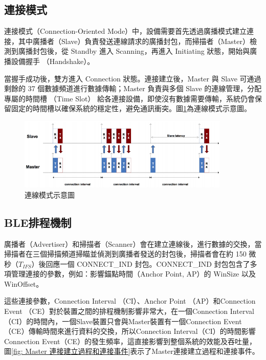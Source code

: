 \begin{ZhChapter}
\subsection{連接模式}

連接模式（Connection-Oriented Mode）中，設備需要首先透過廣播模式建立連接，其中廣播者（Slave）負責發送連線請求的廣播封包，而掃描者（Master）檢測到廣播封包後，從 Standby 進入 Scanning，再進入 Initiating 狀態，開始與廣播設備握手 （Handshake）。

當握手成功後，雙方進入 Connection 狀態。連接建立後，Master 與 Slave 可通過剩餘的 37 個數據頻道進行數據傳輸；Master 負責與多個 Slave 的連線管理，分配專屬的時間槽 （Time Slot） 給各連接設備，即使沒有數據需要傳輸，系統仍會保留固定的時間槽以確保系統的穩定性，避免通訊衝突。圖\ref{fig: 連線模式示意圖}為連線模式示意圖。

\begin{figure}[H]
    \centering
    \includegraphics[width = 0.9\textwidth]{image/連線模式示意圖.png}
    \caption{連線模式示意圖\cite{9035389}}
    \label{fig: 連線模式示意圖}
\end{figure}

\subsection{BLE排程機制}

廣播者（Advertiser）和掃描者（Scanner）會在建立連線後，進行數據的交換，當掃描者在三個掃描頻道掃瞄並偵測到廣播者發送的封包後，掃描者會在約 150 微秒（$T_{IFS}$）後回應一個 CONNECT\_IND 封包。CONNECT\_IND 封包包含了多項管理連接的參數，例如：影響錨點時間（Anchor Point, AP）的 WinSize 以及 WinOffset。

這些連接參數，Connection Interval （CI）、Anchor Point （AP）和Connection Event （CE）對於裝置之間的排程機制影響非常大，在一個Connection Interval（CI）的時間內，一個Slave裝置只會與Master裝置有一個Connection Event（CE）傳輸時間來進行資料的交換，所以Connection Interval（CI）的時間影響Connection Event（CE）的發生頻率，這直接影響到整個系統的效能及吞吐量，圖\ref{fig: Master 連接建立過程和連接事件}表示了Master連接建立過程和連接事件。  


\end{ZhChapter}

